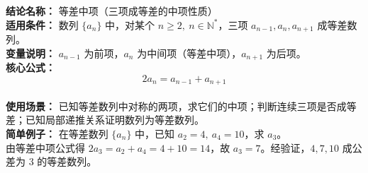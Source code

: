 \textbf{结论名称：} 等差中项（三项成等差的中项性质）\\
\textbf{适用条件：} 数列 \(\{a_n\}\) 中，对某个 \(n\ge 2,\ n\in\mathbb{N}^*\)，三项 \(a_{n-1},a_n,a_{n+1}\) 成等差数列。\\
\textbf{变量说明：} \(a_{n-1}\) 为前项，\(a_n\) 为中间项（等差中项），\(a_{n+1}\) 为后项。\\
\textbf{核心公式：} \[ \boxed{2a_n = a_{n-1} + a_{n+1}} \]\\
\textbf{使用场景：} 已知等差数列中对称的两项，求它们的中项；判断连续三项是否成等差；已知局部递推关系证明数列为等差数列。\\
\textbf{简单例子：} 在等差数列 \(\{a_n\}\) 中，已知 \(a_2=4,\ a_4=10\)，求 \(a_3\)。\\
由等差中项公式得 \(2a_3 = a_2 + a_4 = 4+10 = 14\)，故 \(a_3=7\)。经验证，\(4,7,10\) 成公差为 \(3\) 的等差数列。